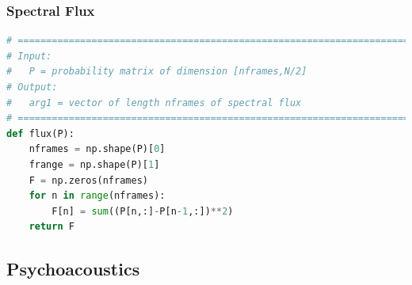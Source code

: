 \documentclass[11pt,a4paper]{article}
\begin{document}
	\subsubsection{Spectral Flux} \label{app:flux}
		\begin{lstlisting}[language=Python,label={lst:flux}]
# =============================================================================
# Input:
#   P = probability matrix of dimension [nframes,N/2]
# Output:
#   arg1 = vector of length nframes of spectral flux
# =============================================================================
def flux(P):
    nframes = np.shape(P)[0]
    frange = np.shape(P)[1]
    F = np.zeros(nframes)
    for n in range(nframes):
        F[n] = sum((P[n,:]-P[n-1,:])**2)
    return F
		\end{lstlisting}
		
\pagebreak

\subsection{Psychoacoustics} \label{app:psycho}
\end{document}
